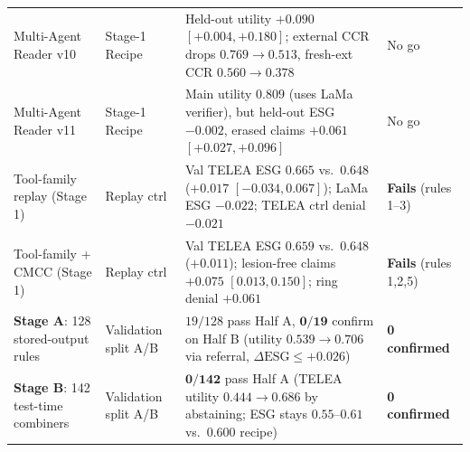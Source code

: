 \documentclass{article} %
\begin{document}
\begin{table}[h]
\begin{center}
{\begin{tabular}{llp{6.0cm}l}
Multi-Agent Reader v10 & Stage-1 Recipe & Held-out utility $+0.090$ $[+0.004, +0.180]$; external CCR drops $0.769 \to 0.513$, fresh-ext CCR $0.560 \to 0.378$ & No go \\
Multi-Agent Reader v11 & Stage-1 Recipe & Main utility $0.809$ (uses LaMa verifier), but held-out ESG $-0.002$, erased claims $+0.061$ $[+0.027, +0.096]$ & No go \\
Tool-family replay (Stage 1) & Replay ctrl & Val TELEA ESG $0.665$ vs.\ $0.648$ ($+0.017$ $[-0.034, 0.067]$); LaMa ESG $-0.022$; TELEA ctrl denial $-0.021$ & \textbf{Fails} (rules 1--3) \\
Tool-family + CMCC (Stage 1) & Replay ctrl & Val TELEA ESG $0.659$ vs.\ $0.648$ ($+0.011$); lesion-free claims $+0.075$ $[0.013, 0.150]$; ring denial $+0.061$ & \textbf{Fails} (rules 1,2,5) \\
\midrule
\textbf{Stage A}: 128 stored-output rules & Validation split A/B & $19/128$ pass Half A, $\mathbf{0/19}$ confirm on Half B (utility $0.539 \to 0.706$ via referral, $\Delta\text{ESG} \le +0.026$) & \textbf{0 confirmed} \\
\textbf{Stage B}: 142 test-time combiners & Validation split A/B & $\mathbf{0/142}$ pass Half A (TELEA utility $0.444 \to 0.686$ by abstaining; ESG stays $0.55\text{--}0.61$ vs.\ $0.600$ recipe) & \textbf{0 confirmed} \\
\bottomrule
\end{tabular}%
}
\end{center}
\end{table}
\end{document}
